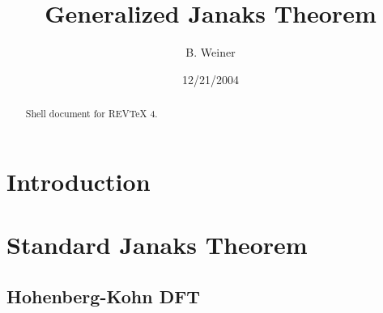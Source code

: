 \documentclass[aps,preprint]{revtex4}%
\begin{document}
\preprint{ }
\title[Janaks Theorem]{Generalized Janaks Theorem}
\author{B. Weiner}

\begin{abstract}
Shell document for REV\TeX{} 4.

\end{abstract}
\date{12/21/2004}
\maketitle
\tableofcontents


\section{Introduction\label{Intro}}

\bigskip

\section{Standard Janaks Theorem\label{Standard}}

\subsection{Hohenberg-Kohn DFT}
\end{document}
